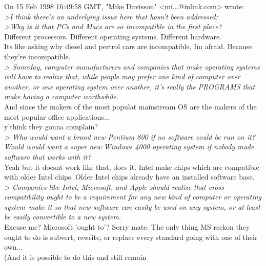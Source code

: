 \documentclass[11pt,twoside,a4paper]{article}
\begin{document}
\begin{multicols*}{2}
On 15 Feb 1998 16:49:58 GMT, "Mike Davisson" <mi...@inlink.com> wrote:~\\
\emph{>I think there's an underlying issue here that hasn't been addressed:}~\\
\emph{>Why is it that PCs and Macs are so incompatible in the first place?}~\\

   Different processors.   Different operating systems.  Different hardware.~\\
   Its like asking why diesel and pertrol cars are incompatible, Im afraid.  Because they're incompatible.~\\  

\emph{> Someday, computer manufacturers and companies that make operating systems will have to realize that, while people may prefer one kind of computer over another, or one operating system over another, it's really the PROGRAMS that make having a computer worthwhile.}~\\

And since the makers of the most populat mainstream OS are the makers of the most popular office applications...~\\
  y'think they gonna complain?~\\

\emph{> Who would want a brand new Pentium 800 if no software could be run on it? Would would want a super new Windows 4000 operating system if nobody made software that works with it?}~\\

   Yeah but it doesnt work like that, does it.  Intel make chips which are compatible with older Intel chips.  Older Intel chips already have an installed software base.~\\

\emph{> Companies like Intel, Microsoft, and Apple should realize that cross-compatibility ought to be a requirement for any new kind of computer or operating system--make it so that new software can easily be used on any system, or at least be easily convertible to a new system.}~\\

   Excuse me?  Microsoft 'ought to'?  Sorry mate.  The only thing MS reckon they ought to do is subvert, rewrite, or replace every standard going with one of their own...~\\

  (And it is possible to do this and still remain~\\


\end{multicols*}
\end{document}
